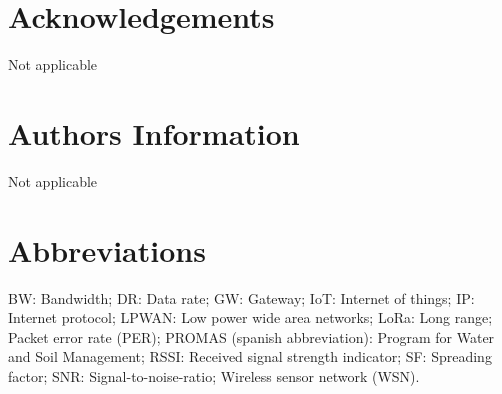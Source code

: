 \section*{Acknowledgements}

Not applicable

\section*{Authors Information}

Not applicable

\section*{Abbreviations}

BW: Bandwidth; DR: Data rate; GW: Gateway; IoT: Internet of things; IP: Internet protocol; LPWAN: Low power wide area networks; LoRa: Long range; Packet error rate (PER); PROMAS (spanish abbreviation): Program for Water and Soil Management; RSSI: Received signal strength indicator; SF: Spreading factor; SNR: Signal-to-noise-ratio;  Wireless sensor network (WSN).


\normalsize





%
%
%


